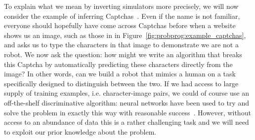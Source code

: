 To explain what we mean by inverting simulators more precisely, we will now consider
the example of inferring Captchas~\citep{mansinghka2013approximate}.   Even if the name is not familiar, 
everyone should hopefully have come across Captchas before when a website shows us an image, such
as those in in Figure~\ref{fig:probprog:example_captchas}, and asks us to
type the characters in that image to demonstrate we are not a robot.  We now ask the
question: how might we write an algorithm that breaks this Captcha by 
automatically predicting these characters directly from the image? In other words, 
can we build a robot that mimics a human on a task specifically designed to 
distinguish between the two.  If we had access to large supply of training examples, i.e.
character-image pairs, we could of course use an off-the-shelf discriminative algorithm:
neural networks have been used to try and solve the problem in exactly this way with reasonable
success~\citep{von2008recaptcha}.  However, without access to an abundance of data this is a rather
challenging task and we will need to exploit our prior knowledge about the problem.  


